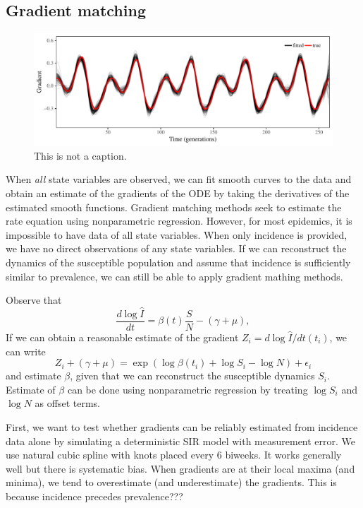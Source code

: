 \documentclass{article}
\begin{document}
\subsection{Gradient matching}

\begin{figure}[t]
\includegraphics[width=\textwidth]{../figure/gradient_matching_sinusoidal.pdf}
\caption{This is not a caption.}
\end{figure}

When \emph{all} state variables are observed, we can fit smooth curves to the data and obtain an estimate of the gradients of the ODE by taking the derivatives of the estimated smooth functions.
Gradient matching methods seek to estimate the rate equation using nonparametric regression.
However, for most epidemics, it is impossible to have data of all state variables.
When only incidence is provided, we have no direct observations of any state variables. 
If we can reconstruct the dynamics of the susceptible population and assume that incidence is sufficiently similar to prevalence, we can still be able to apply gradient mathing methods.

Observe that
\begin{equation}
\frac{d \log\hat{I}}{dt} = \beta(t) \frac{S}{N} - (\gamma + \mu),
\end{equation}
If we can obtain a reasonable estimate of the gradient $Z_i = d \log \hat{I}/dt (t_i)$, we can write
\begin{equation}
Z_i + (\gamma + \mu) = \exp \left(\log \beta (t_i) + \log S_i - \log N \right)  + \epsilon_i
\end{equation}
and estimate $\beta$, given that we can reconstruct the susceptible dynamics $S_i$.
Estimate of $\beta$ can be done using nonparametric regression by treating $\log S_i$ and $\log N$ as offset terms.

First, we want to test whether gradients can be reliably estimated from incidence data alone by simulating a deterministic SIR model with measurement error.
We use natural cubic spline with knots placed every 6 biweeks.
It works generally well but there is systematic bias.
When gradients are at their local maxima (and minima), we tend to overestimate (and underestimate) the gradients.
This is because incidence precedes prevalence???
\end{document}
